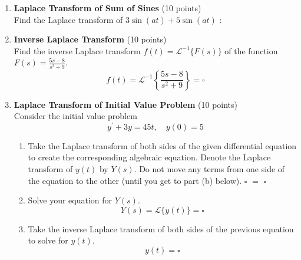 \begin{enumerate}
  \item \textbf{Laplace Transform of Sum of Sines} (10 points)\\
  Find the Laplace transform of $3 \sin (a t)+5 \sin (a t)$ :
  \begin{subanswer}
  \end{subanswer}

  \item \textbf{Inverse Laplace Transform} (10 points)\\
  Find the inverse Laplace transform $f(t)=\mathcal{L}^{-1}\{F(s)\}$ of the function $F(s)=\frac{5 s-8}{s^2+9}$.
  $$
  f(t)=\mathcal{L}^{-1}\left\{\frac{5 s-8}{s^2+9}\right\}=\square
  $$
  \begin{subanswer}
  \end{subanswer}

  \item \textbf{Laplace Transform of Initial Value Problem} (10 points)\\
  Consider the initial value problem
  $$
  y^{\prime}+3 y=45 t, \quad y(0)=5
  $$
  \begin{enumerate}[label=\alph*]
    \item Take the Laplace transform of both sides of the given differential equation to create the corresponding algebraic equation. Denote the Laplace transform of $y(t)$ by $Y(s)$. Do not move any terms from one side of the equation to the other (until you get to part (b) below).
    $\square$ $=$ $\square$
    \begin{subanswer}
    \end{subanswer}
    \item Solve your equation for $Y(s)$.
    $$
    Y(s)=\mathcal{L}\{y(t)\}=\square
    $$
    \begin{subanswer}
    \end{subanswer}
    \item Take the inverse Laplace transform of both sides of the previous equation to solve for $y(t)$.
    $$
    y(t)=\square
    $$
    \begin{subanswer}
    \end{subanswer}
  \end{enumerate}


\end{enumerate}
